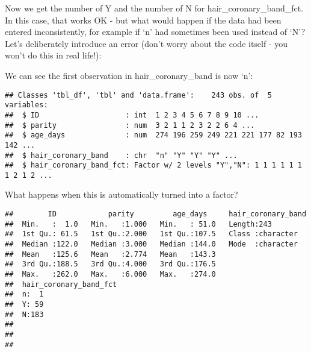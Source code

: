 \documentclass[
]{article}
\newenvironment{Shaded}{\begin{snugshade}}{\end{snugshade}}
\newcommand{\DataTypeTok}[1]{\textcolor[rgb]{0.13,0.29,0.53}{#1}}
\newcommand{\DecValTok}[1]{\textcolor[rgb]{0.00,0.00,0.81}{#1}}
\newcommand{\KeywordTok}[1]{\textcolor[rgb]{0.13,0.29,0.53}{\textbf{#1}}}
\newcommand{\NormalTok}[1]{#1}
\newcommand{\OperatorTok}[1]{\textcolor[rgb]{0.81,0.36,0.00}{\textbf{#1}}}
\newcommand{\StringTok}[1]{\textcolor[rgb]{0.31,0.60,0.02}{#1}}
\begin{document}
Now we get the number of Y and the number of N for
hair\_coronary\_band\_fct. In this case, that works OK - but what would
happen if the data had been entered inconsistently, for example if `n'
had sometimes been used instead of `N'? Let's deliberately introduce an
error (don't worry about the code itself - you won't do this in real
life!):

\begin{Shaded}
\end{Shaded}

We can see the first observation in hair\_coronary\_band is now `n':

\begin{Shaded}
\end{Shaded}

\begin{verbatim}
## Classes 'tbl_df', 'tbl' and 'data.frame':    243 obs. of  5 variables:
##  $ ID                    : int  1 2 3 4 5 6 7 8 9 10 ...
##  $ parity                : num  3 2 1 1 2 3 2 2 6 4 ...
##  $ age_days              : num  274 196 259 249 221 221 177 82 193 142 ...
##  $ hair_coronary_band    : chr  "n" "Y" "Y" "Y" ...
##  $ hair_coronary_band_fct: Factor w/ 2 levels "Y","N": 1 1 1 1 1 1 1 2 1 2 ...
\end{verbatim}

What happens when this is automatically turned into a factor?

\begin{Shaded}
\end{Shaded}

\begin{verbatim}
##        ID            parity         age_days     hair_coronary_band
##  Min.   :  1.0   Min.   :1.000   Min.   : 51.0   Length:243        
##  1st Qu.: 61.5   1st Qu.:2.000   1st Qu.:107.5   Class :character  
##  Median :122.0   Median :3.000   Median :144.0   Mode  :character  
##  Mean   :125.6   Mean   :2.774   Mean   :143.3                     
##  3rd Qu.:188.5   3rd Qu.:4.000   3rd Qu.:176.5                     
##  Max.   :262.0   Max.   :6.000   Max.   :274.0                     
##  hair_coronary_band_fct
##  n:  1                 
##  Y: 59                 
##  N:183                 
##                        
##                        
## 
\end{verbatim}
\end{document}

